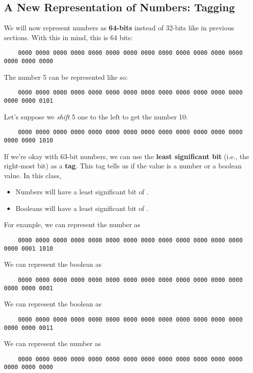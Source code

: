 \documentclass[letterpaper]{article}
\begin{document}
\subsection{A New Representation of Numbers: Tagging}
We will now represent numbers as \textbf{64-bits} instead of 32-bits like in previous sections. With this in mind, this is 64 bits:
\begin{verbatim}
    0000 0000 0000 0000 0000 0000 0000 0000 0000 0000 0000 0000 0000 0000 0000 0000\end{verbatim}
The number 5 can be represented like so: 
\begin{verbatim}
    0000 0000 0000 0000 0000 0000 0000 0000 0000 0000 0000 0000 0000 0000 0000 0101\end{verbatim}

Let's suppose we \emph{shift} 5 one to the left to get the number 10: 
\begin{verbatim}
    0000 0000 0000 0000 0000 0000 0000 0000 0000 0000 0000 0000 0000 0000 0000 1010\end{verbatim}

If we're okay with 63-bit numbers, we can use the \textbf{least significant bit} (i.e., the right-most bit) as a \textbf{tag}. This tag tells us if the value is a number or a boolean value. In this class, 
\begin{itemize}
    \item Numbers will have a least significant bit of .
    \item Booleans will have a least significant bit of . 
\end{itemize}
For example, we can represent the number  as 
\begin{verbatim}
    0000 0000 0000 0000 0000 0000 0000 0000 0000 0000 0000 0000 0000 0000 0001 1010\end{verbatim}
We can represent the boolean  as 
\begin{verbatim}
    0000 0000 0000 0000 0000 0000 0000 0000 0000 0000 0000 0000 0000 0000 0000 0001\end{verbatim}
We can represent the boolean  as 
\begin{verbatim}
    0000 0000 0000 0000 0000 0000 0000 0000 0000 0000 0000 0000 0000 0000 0000 0011\end{verbatim}
We can represent the number  as 
\begin{verbatim}
    0000 0000 0000 0000 0000 0000 0000 0000 0000 0000 0000 0000 0000 0000 0000 0000\end{verbatim}
    
\end{document}
